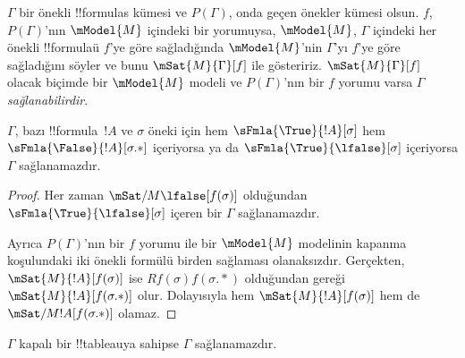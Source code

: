 \documentclass[../../../include/open-logic-section]{subfiles}
\begin{document}
\begin{defn}
  $\Gamma$ bir önekli !!{formula}s kümesi ve $P(\Gamma)$, onda geçen önekler
  kümesi olsun. $f$, $P(\Gamma)$'nın $\mModel{M}$ içindeki bir yorumuysa,
  $\mModel{M}$, $\Gamma$ içindeki her önekli !!{formula}{}ü $f$'ye göre
  sağladığında $\mModel{M}$'nin $\Gamma$'yı $f$'ye göre sağladığını söyler ve
  bunu $\mSat{M}{\Gamma}[f]$ ile gösteririz. $\mSat{M}{\Gamma}[f]$ olacak
  biçimde bir $\mModel{M}$ modeli ve $P(\Gamma)$'nın bir $f$ yorumu varsa
  $\Gamma$ \emph{sağlanabilirdir}.
\end{defn}

\begin{prop}
  $\Gamma$, bazı !!{formula}~$!A$ ve $\sigma$ öneki için hem
  $\sFmla{\True}{!A}[\sigma]$ hem $\sFmla{\False}{!A}[\sigma.{*}]$ içeriyorsa
  ya da $\sFmla{\True}{\lfalse}[\sigma]$ içeriyorsa $\Gamma$ sağlanamazdır.
\end{prop}

\begin{proof}
  Her zaman $\mSat/{M}{\lfalse}[f(\sigma)]$ olduğundan
  $\sFmla{\True}{\lfalse}[\sigma]$ içeren bir $\Gamma$ sağlanamazdır.

  Ayrıca $P(\Gamma)$'nın bir $f$ yorumu ile bir $\mModel{M}$ modelinin
  kapanma koşulundaki iki önekli formülü birden sağlaması olanaksızdır.
  Gerçekten,
  $\mSat{M}{!A}[f(\sigma)]$ ise $Rf(\sigma)f(\sigma.{*})$ olduğundan
   gereği
  $\mSat{M}{!A}[f(\sigma.{*})]$ olur. Dolayısıyla hem
  $\mSat{M}{!A}[f(\sigma)]$ hem de
  $\mSat/{M}{!A}[f(\sigma.{*})]$ olamaz.
\end{proof}

\begin{thm}[Sağlamlık]
  $\Gamma$ kapalı bir !!{tableau}{}ya sahipse $\Gamma$ sağlanamazdır.
\end{thm}
\end{document}
